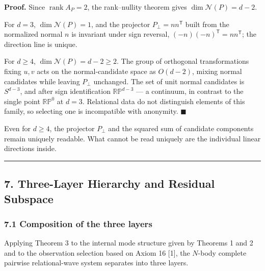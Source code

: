 \documentclass[
  a4paper,
]{article}
\begin{document}
\textbf{Proof.} Since \(\operatorname{rank}A_P=2\), the rank--nullity
theorem gives \(\dim\mathcal N(P)=d-2\).

For \(d=3\), \(\dim\mathcal N(P)=1\), and the projector
\(P_\perp=nn^{\mathsf T}\) built from the normalized normal \(n\) is
invariant under sign reversal, \((-n)(-n)^{\mathsf T}=nn^{\mathsf T}\);
the direction line is unique.

For \(d\ge4\), \(\dim\mathcal N(P)=d-2\ge2\). The group of orthogonal
transformations fixing \(u,v\) acts on the normal-candidate space as
\(O(d-2)\), mixing normal candidates while leaving \(P_\perp\)
unchanged. The set of unit normal candidates is \(S^{d-3}\), and after
sign identification \(\mathbb{RP}^{d-3}\) --- a continuum, in contrast
to the single point \(\mathbb{RP}^0\) at \(d=3\). Relational data do not
distinguish elements of this family, so selecting one is incompatible
with anonymity. \(\blacksquare\)

Even for \(d\ge4\), the projector \(P_\perp\) and the squared sum of
candidate components remain uniquely readable. What cannot be read
uniquely are the individual linear directions inside.

\begin{center}\rule{0.5\linewidth}{0.5pt}\end{center}

\subsection{7. Three-Layer Hierarchy and Residual
Subspace}\label{three-layer-hierarchy-and-residual-subspace}

\subsubsection{7.1 Composition of the three
layers}\label{composition-of-the-three-layers}

Applying Theorem 3 to the internal mode structure given by Theorems 1
and 2 and to the observation selection based on Axiom 16 {[}1{]}, the
\(N\)-body complete pairwise relational-wave system separates into three
layers.
\end{document}

